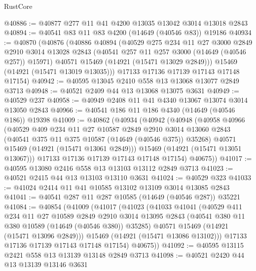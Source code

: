 \begin{lexlean}{RustCore}
\begin{coremodule}
@40886 := @40877 @277 @11 @41 @4200 @13035 @13042 @3014 @13018 @2843
@40894 := @40541 @83 @11 @83 @4200 (@14649 (@40546 @83)) @19186
@40934 := @40870
    (@40876
      (@40886
        @40894
        (@40529
          @275
          @234
          @11
          @27
          @3000
          @2849
          @2910
          @3014
          @13028
          @2843
          (@40541 @257 @11 @257 @3000 (@14649 (@40546 @257)) @15971)
          @40571
          @15469
          (@14921 (@15471 @13029 @2849)))
        @15469
        (@14921 (@15471 @13019 @13035)))
      @17133
      @17136
      @17139
      @17143
      @17148
      @17154)
@40942 := @40595 @13045 @2410 @558 @13 @13068 @13077 @2849 @3713
@40948 := @40521 @2409 @44 @13 @13068 @13075 @3631
@40949 := @40529 @237
@40958 := @40949 @2408 @11 @41 @4340 @13067 @13074 @3014 @13050 @2843
@40966 := @40541 @186 @11 @186 @4340 (@14649 (@40546 @186)) @19398
@41009 := @40862
    (@40934
      (@40942
        (@40948
          (@40958
            @40966
            (@40529
              @409
              @234
              @11
              @27
              @10587
              @2849
              @2910
              @3014
              @13060
              @2843
              (@40541 @375 @11 @375 @10587 (@14649 (@40546 @375)) @35268)
              @40571
              @15469
              (@14921 (@15471 @13061 @2849)))
            @15469
            (@14921 (@15471 @13051 @13067)))
          @17133
          @17136
          @17139
          @17143
          @17148
          @17154)
        @40675))
@41017 := @40595 @13080 @2416 @558 @13 @13103 @13112 @2849 @3713
@41023 := @40521 @2415 @44 @13 @13103 @13110 @3631
@41024 := @40529 @323
@41033 := @41024 @2414 @11 @41 @10585 @13102 @13109 @3014 @13085 @2843
@41041 := @40541 @287 @11 @287 @10585 (@14649 (@40546 @287)) @35221
@41084 := @40854
    (@41009
      (@41017
        (@41023
          (@41033
            @41041
            (@40529
              @411
              @234
              @11
              @27
              @10589
              @2849
              @2910
              @3014
              @13095
              @2843
              (@40541 @380 @11 @380 @10589 (@14649 (@40546 @380)) @35285)
              @40571
              @15469
              (@14921 (@15471 @13096 @2849)))
            @15469
            (@14921 (@15471 @13086 @13102)))
          @17133
          @17136
          @17139
          @17143
          @17148
          @17154)
        @40675))
@41092 := @40595 @13115 @2421 @558 @13 @13139 @13148 @2849 @3713
@41098 := @40521 @2420 @44 @13 @13139 @13146 @3631

\end{coremodule}
\end{lexlean}
